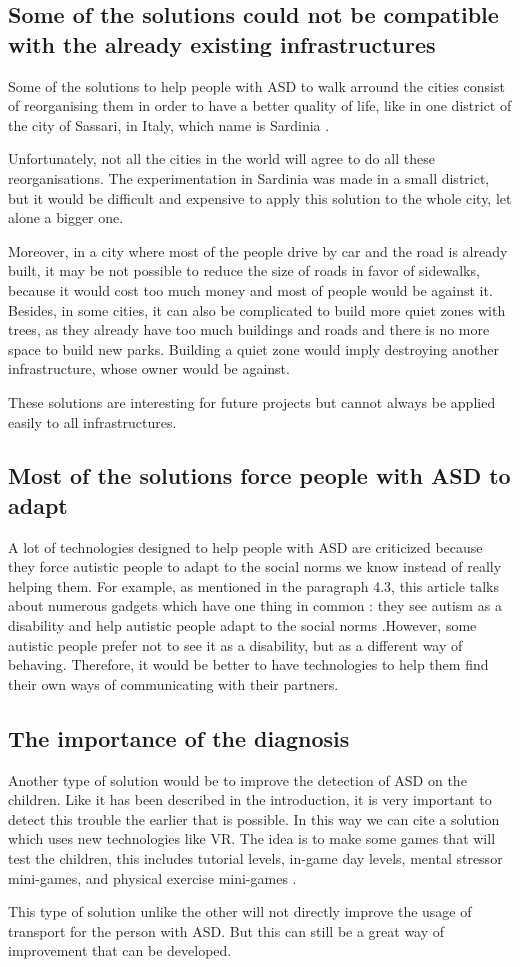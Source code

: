 \subsection{Some of the solutions could not be compatible with the already existing infrastructures}
Some of the solutions to help people with ASD to walk arround the cities consist of reorganising them in order to have a better quality of life, like in one district of the city of Sassari, in Italy, which name is Sardinia \cite{2018MobilityPoliciesExtraSmall}.

Unfortunately, not all the cities in the world will agree to do all these reorganisations. The experimentation in Sardinia was made in a small district, but it would be difficult and expensive to apply this solution to the whole city, let alone a bigger one.

Moreover, in a city where most of the people drive by car and the road is already built, it may be not possible to reduce the size of roads in favor of sidewalks, because it would cost too much money and most of people would be against it. Besides, in some cities, it can also be complicated to build more quiet zones with trees, as they already have too much buildings and roads and there is no more space to build new parks. Building a quiet zone would imply destroying another infrastructure, whose owner would be against. 

These solutions are interesting for future projects but cannot always be applied easily to all infrastructures.

\subsection{Most of the solutions force people with ASD to adapt}
A lot of technologies designed to help people with ASD are criticized because they force autistic people to adapt to the social norms we know instead of really helping them. For example, as mentioned in the paragraph 4.3, this article talks about numerous gadgets which have one thing in common : they see autism as a disability and help autistic people adapt to the social norms \cite{2017UTravelSmartMobility}.However, some autistic people prefer not to see it as a disability, but as a different way of behaving. Therefore, it would be better to have technologies to help them find their own ways of communicating with their partners. 

\subsection{The importance of the diagnosis}
Another type of solution would be to improve the detection of ASD on the children. Like it has been described in the introduction, it is very important to detect this trouble the earlier that is possible. In this way we can cite a solution which uses new technologies like VR. The idea is to make some games that will test the children, this includes tutorial levels, in-game day levels, mental stressor mini-games, and physical exercise mini-games  \cite{2021DesigningSmartVirtual}.

This type of solution unlike the other will not directly improve the usage of transport for the person with ASD. But this can still be a great way of improvement that can be developed. 
